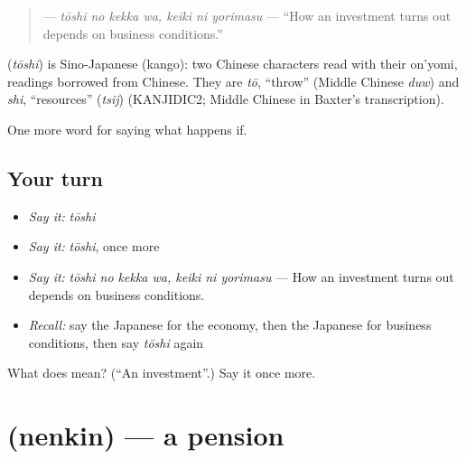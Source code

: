 \begin{quote}
\textbf{  } — \emph{tōshi no kekka wa, keiki ni yorimasu} — \textquotedblleft{}How an investment turns out depends on business conditions.\textquotedblright{}
\end{quote}

\begin{cousinweb}
\textbf{} (\emph{tōshi}) is Sino-Japanese (kango): two Chinese characters read with their on'yomi, readings borrowed from Chinese. They are \emph{tō}, \textquotedblleft{}throw\textquotedblright{} (Middle Chinese \emph{duw}) and \emph{shi}, \textquotedblleft{}resources\textquotedblright{} (\emph{tsij}) (KANJIDIC2; Middle Chinese in Baxter's transcription).
\end{cousinweb}

\begin{grammarlens}[title={What you've built}]
One more word for saying what happens if.
\end{grammarlens}

\subsection*{Your turn}
\begin{itemize}
\raggedright
  \item \emph{Say it:} \emph{tōshi}
  \item \emph{Say it:} \emph{tōshi}, once more
  \item \emph{Say it:} \emph{tōshi no kekka wa, keiki ni yorimasu} — How an investment turns out depends on business conditions.
  \item \emph{Recall:} say the Japanese for the economy, then the Japanese for business conditions, then say \emph{tōshi} again
\end{itemize}

\begin{tcolorbox}[breakable,colback=teal!4,colframe=teal!35!black,title={Before you move on}]
What does  mean? (\textquotedblleft{}An investment\textquotedblright{}.) Say it once more.
\end{tcolorbox}
\section[\texorpdfstring{\ja{ねんきん} (nenkin)}{ねんきん (nenkin)}]{ (nenkin) — a pension}

\label{lesson:JA-C365-nenkin}



